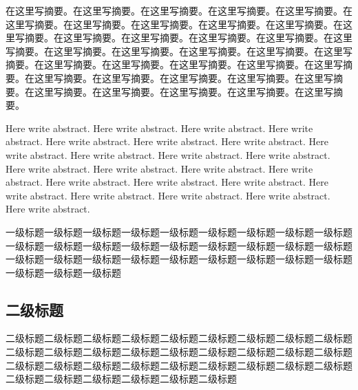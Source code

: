 \documentclass{resume/dhuBachelorclass}
\begin{document}
\reAbstract %

在这里写摘要。在这里写摘要。在这里写摘要。在这里写摘要。在这里写摘要。在这里写摘要。在这里写摘要。在这里写摘要。在这里写摘要。在这里写摘要。在这里写摘要。在这里写摘要。在这里写摘要。在这里写摘要。在这里写摘要。在这里写摘要。在这里写摘要。在这里写摘要。在这里写摘要。在这里写摘要。在这里写摘要。在这里写摘要。在这里写摘要。在这里写摘要。在这里写摘要。在这里写摘要。在这里写摘要。在这里写摘要。在这里写摘要。在这里写摘要。在这里写摘要。在这里写摘要。在这里写摘要。在这里写摘要。在这里写摘要。在这里写摘要。


\reAbstractEN

Here write abstract. Here write abstract. Here write abstract. Here write abstract. Here write abstract. Here write abstract. Here write abstract. Here write abstract. Here write abstract. Here write abstract. Here write abstract. Here write abstract. Here write abstract. Here write abstract. Here write abstract. Here write abstract. Here write abstract. Here write abstract. Here write abstract. Here write abstract. Here write abstract. Here write abstract. Here write abstract. 


\begin{center}
    \tableofcontents
\end{center}



一级标题一级标题一级标题一级标题一级标题一级标题一级标题一级标题一级标题一级标题一级标题一级标题一级标题一级标题一级标题一级标题一级标题一级标题一级标题一级标题一级标题一级标题一级标题一级标题一级标题一级标题一级标题一级标题一级标题一级标题

\subsection{二级标题}
二级标题二级标题二级标题二级标题二级标题二级标题二级标题二级标题二级标题二级标题二级标题二级标题二级标题二级标题二级标题二级标题二级标题二级标题二级标题二级标题二级标题二级标题二级标题二级标题二级标题二级标题二级标题二级标题二级标题二级标题二级标题二级标题二级标题
\end{document}
